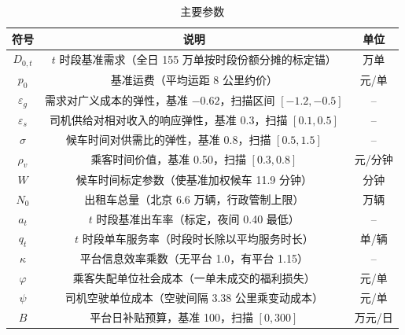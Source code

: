 \documentclass[12pt,a4paper]{ctexart}
\begin{document}
\begin{table}[H]
\centering
\caption{主要参数}
\label{tab:param}
\begin{tabular}{c c c}
\toprule
符号 & 说明 & 单位 \\
\midrule
$D_{0,t}$ & $t$ 时段基准需求（全日 155 万单按时段份额分摊的标定锚） & 万单 \\
$p_0$ & 基准运费（平均运距 8 公里约价） & 元/单 \\
$\varepsilon_g$ & 需求对广义成本的弹性，基准 $-0.62$，扫描区间 $[-1.2,-0.5]$ & -- \\
$\varepsilon_s$ & 司机供给对相对收入的响应弹性，基准 0.3，扫描 $[0.1,0.5]$ & -- \\
$\sigma$ & 候车时间对供需比的弹性，基准 0.8，扫描 $[0.5,1.5]$ & -- \\
$\rho_v$ & 乘客时间价值，基准 0.50，扫描 $[0.3,0.8]$ & 元/分钟 \\
$\hat{W}$ & 候车时间标定参数（使基准加权候车 11.9 分钟） & 分钟 \\
$N_0$ & 出租车总量（北京 6.6 万辆，行政管制上限） & 万辆 \\
$a_t$ & $t$ 时段基准出车率（标定，夜间 0.40 最低） & -- \\
$q_t$ & $t$ 时段单车服务率（时段时长除以平均服务时长） & 单/辆 \\
$\kappa$ & 平台信息效率乘数（无平台 1.0，有平台 1.15） & -- \\
$\varphi$ & 乘客失配单位社会成本（一单未成交的福利损失） & 元/单 \\
$\psi$ & 司机空驶单位成本（空驶间隔 3.38 公里乘变动成本） & 元/单 \\
$B$ & 平台日补贴预算，基准 100，扫描 $[0,300]$ & 万元/日 \\
\bottomrule
\end{tabular}
\end{table}
\end{document}
